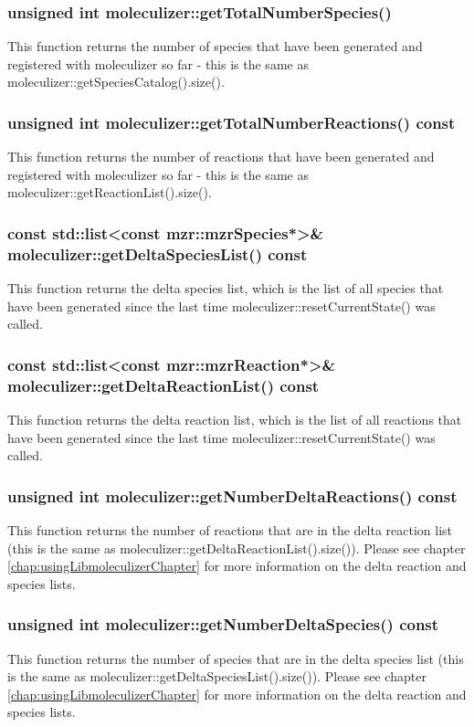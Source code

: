\subsubsection{unsigned int moleculizer::getTotalNumberSpecies()}
This function returns the number of species that have been generated
and registered with moleculizer so far - this is the same as
moleculizer::getSpeciesCatalog().size().

\subsubsection{unsigned int moleculizer::getTotalNumberReactions()
  const}
This function returns the number of reactions that have been generated
and registered with moleculizer so far - this is the same as
moleculizer::getReactionList().size(). 

\subsubsection{const std::list<const mzr::mzrSpecies*>\&
  moleculizer::getDeltaSpeciesList() const}
This function returns the delta species list, which is the list of all
species that have been generated since the last time
moleculizer::resetCurrentState() was called.  

\subsubsection{const std::list<const mzr::mzrReaction*>\&
  moleculizer::getDeltaReactionList() const}
This function returns the delta reaction list, which is the list of all
reactions that have been generated since the last time
moleculizer::resetCurrentState() was called.  

\subsubsection{unsigned int moleculizer::getNumberDeltaReactions()
  const}
This function returns the number of reactions that are in the delta
reaction list (this is the same as
moleculizer::getDeltaReactionList().size()).  Please see chapter
\ref{chap:usingLibmoleculizerChapter} for more information on the
delta reaction and species lists.  

\subsubsection{unsigned int moleculizer::getNumberDeltaSpecies()
  const}
This function returns the number of species that are in the delta
species list (this is the same as
moleculizer::getDeltaSpeciesList().size()).  Please see chapter
\ref{chap:usingLibmoleculizerChapter} for more information on the
delta reaction and species lists.  


